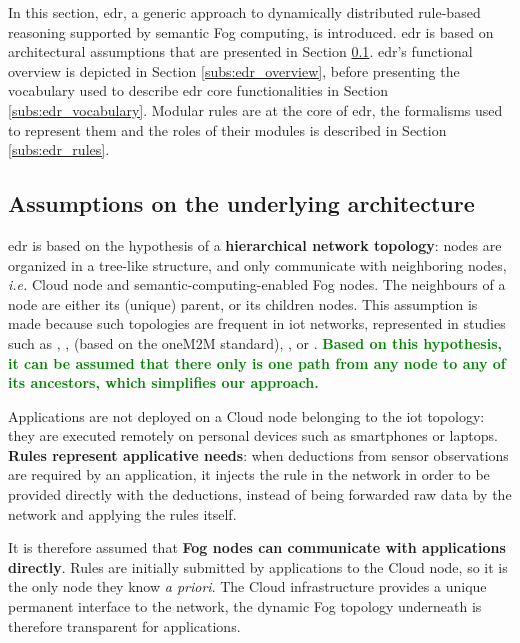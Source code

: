 \documentclass{iosart2c}
\newcommand{\added}[1]{\textcolor{green}{\textbf{#1}}}
\begin{document}
In this section, \gls{edr}, a generic approach to dynamically distributed rule-based reasoning supported by semantic Fog computing, is introduced. 
\gls{edr} is based on architectural assumptions that are presented in Section \textsection \ref{subs:edr_asumptions}.
\gls{edr}'s functional overview is depicted in Section \textsection \ref{subs:edr_overview}, before presenting the vocabulary used to describe \gls{edr} core functionalities in Section \textsection \ref{subs:edr_vocabulary}.
Modular rules are at the core of \gls{edr}, the formalisms used to represent them and the roles of their modules is described in Section \textsection \ref{subs:edr_rules}.

\subsection{Assumptions on the underlying architecture}
\label{subs:edr_asumptions}

\gls{edr} is based on the hypothesis of a \textbf{hierarchical network topology}: nodes are organized in a tree-like structure, and only communicate with neighboring nodes, \textit{i.e.} Cloud node and semantic-computing-enabled Fog nodes. 
The neighbours of a node are either its (unique) parent, or its children nodes. 
This assumption is made because such topologies are frequent in \gls{iot} networks, represented in studies such as \cite{Rodriguez2010}, \cite{Zanella2014}, \cite{Alaya2015} (based on the oneM2M standard), \cite{Szilagyi2016}, or \cite{Su2018}.
\added{Based on this hypothesis, it can be assumed that there only is one path from any node to any of its ancestors, which simplifies our approach.}

Applications are not deployed on a Cloud node belonging to the \gls{iot} topology: they are executed remotely on personal devices such as smartphones or laptops.
\textbf{Rules represent applicative needs}: when deductions from sensor observations are required by an application, it injects the rule in the network in order to be provided directly with the deductions, instead of being forwarded raw data by the network and applying the rules itself.

It is therefore assumed that \textbf{Fog nodes can communicate with applications directly}.
Rules are initially submitted by applications to the Cloud node, so it is the only node they know \textit{a priori}. 
The Cloud infrastructure provides a unique permanent interface to the network, the dynamic Fog topology underneath is therefore transparent for applications.
\end{document}
